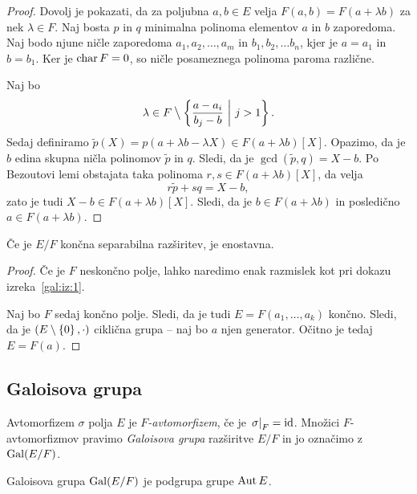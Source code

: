 \begin{proof}
Dovolj je pokazati, da za poljubna $a, b \in E$ velja
$F(a,b) = F(a + \lambda b)$ za nek $\lambda \in F$. Naj bosta $p$
in $q$ minimalna polinoma elementov $a$ in $b$ zaporedoma. Naj bodo
njune ničle zaporedoma $a_1, a_2, \dots, a_m$ in
$b_1, b_2, \dots b_n$, kjer je $a = a_1$ in $b = b_1$. Ker je
$\operatorname{char} F = 0$, so ničle posameznega polinoma paroma različne.

Naj bo
\[
\lambda \in F \mathbin{\big\backslash} \left\{\frac{a-a_i}{b_j-b}~\middle\vert~j > 1\right\}.
\]
Sedaj definiramo
$\tilde{p}(X) = p(a+\lambda b-\lambda X) \in F(a + \lambda b)[X]$.
Opazimo, da je $b$ edina skupna ničla polinomov $\tilde{p}$ in $q$.
Sledi, da je $\gcd(\tilde{p},q) = X - b$. Po Bezoutovi lemi
obstajata taka polinoma $r,s \in F(a+\lambda b)[X]$, da velja
\[
r \tilde{p} + sq = X-b,
\]
zato je tudi $X-b \in F(a+\lambda b)[X]$. Sledi, da je
$b \in F(a+\lambda b)$ in posledično $a \in F(a+\lambda b)$.
\end{proof}

\begin{izrek}
Če je $E/F$ končna separabilna razširitev, je enostavna.
\end{izrek}

\begin{proof}
Če je $F$ neskončno polje, lahko naredimo enak razmislek kot pri
dokazu izreka~\ref{gal:iz:1}.

Naj bo $F$ sedaj končno polje. Sledi, da je tudi
$E = F(a_1, \dots, a_k)$ končno. Sledi, da je
$(E \setminus \left\{0\right\}, \cdot)$ ciklična grupa -- naj bo $a$ njen
generator. Očitno je tedaj $E = F(a)$.
\end{proof}

\newpage

\subsection{Galoisova grupa}

\begin{definicija}
Avtomorfizem $\sigma$ polja $E$ je
\emph{$F$-avtomorfizem}, če je
$\left. \sigma\right|_{F}^{} = \operatorname{id}$. Množici $F$-avtomorfizmov pravimo
\emph{Galoisova grupa} razširitve $E/F$ in
jo označimo z $\operatorname{Gal}(E/F)$.
\end{definicija}

\begin{opomba}
Galoisova grupa $\operatorname{Gal}(E/F)$ je podgrupa grupe $\operatorname{Aut} E$.
\end{opomba}

